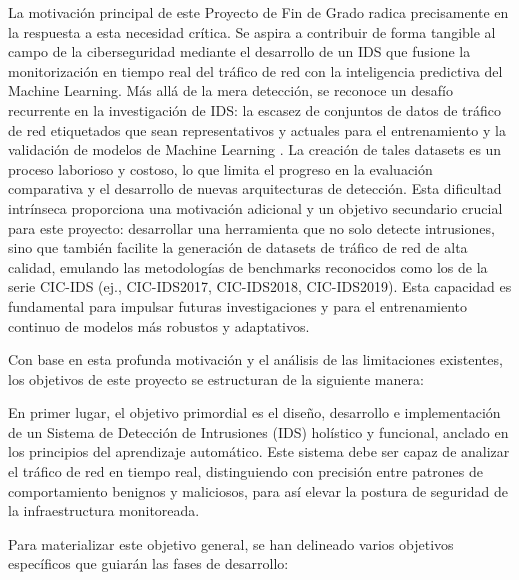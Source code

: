 La motivación principal de este Proyecto de Fin de Grado radica precisamente en la respuesta a esta necesidad crítica. Se aspira a contribuir de forma tangible al campo de la ciberseguridad mediante el desarrollo de un IDS que fusione la monitorización en tiempo real del tráfico de red con la inteligencia predictiva del Machine Learning. Más allá de la mera detección, se reconoce un desafío recurrente en la investigación de IDS: la escasez de conjuntos de datos de tráfico de red etiquetados que sean representativos y actuales para el entrenamiento y la validación de modelos de Machine Learning \cite{PolaniaArias2021EvaluacionMLIDS}. La creación de tales datasets es un proceso laborioso y costoso, lo que limita el progreso en la evaluación comparativa y el desarrollo de nuevas arquitecturas de detección. Esta dificultad intrínseca proporciona una motivación adicional y un objetivo secundario crucial para este proyecto: desarrollar una herramienta que no solo detecte intrusiones, sino que también facilite la generación de datasets de tráfico de red de alta calidad, emulando las metodologías de benchmarks reconocidos como los de la serie CIC-IDS (ej., CIC-IDS2017, CIC-IDS2018, CIC-IDS2019). Esta capacidad es fundamental para impulsar futuras investigaciones y para el entrenamiento continuo de modelos más robustos y adaptativos.

Con base en esta profunda motivación y el análisis de las limitaciones existentes, los objetivos de este proyecto se estructuran de la siguiente manera:

En primer lugar, el objetivo primordial es el diseño, desarrollo e implementación de un Sistema de Detección de Intrusiones (IDS) holístico y funcional, anclado en los principios del aprendizaje automático. Este sistema debe ser capaz de analizar el tráfico de red en tiempo real, distinguiendo con precisión entre patrones de comportamiento benignos y maliciosos, para así elevar la postura de seguridad de la infraestructura monitoreada.

Para materializar este objetivo general, se han delineado varios objetivos específicos que guiarán las fases de desarrollo:

